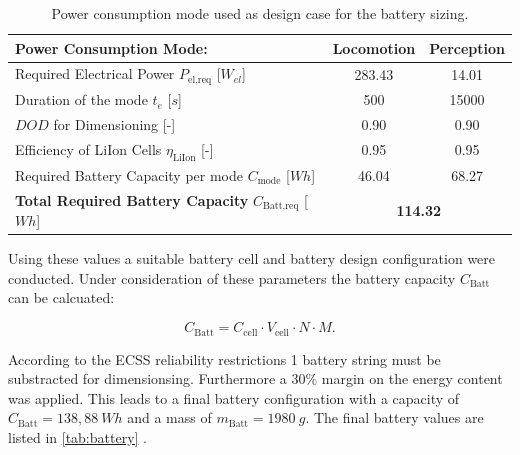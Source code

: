 \begin{table}[htb]
\centering

\begin{tabular}{|l|c|c|}
\hline
\textbf{Power Consumption Mode:}                        & \textbf{Locomotion} & \textbf{Perception} \\ \hline
Required Electrical Power $P_\text{el,req}$ [$W_{el}$]         & 283.43              & 14.01               \\ \hline
Duration of the mode $t_e$ [$s$]                          & 500              & 15000            \\ \hline
$DOD$ for Dimensioning [-]                              & 0.90                & 0.90                \\ \hline
Efficiency of LiIon Cells $\eta_\text{LiIon}$ [-]       & 0.95                & 0.95                \\ \hline
Required Battery Capacity per mode $C_\text{mode}$ [$Wh$] & 46.04               & 68.27               \\ \hline
\textbf{Total Required Battery Capacity} $C_\text{Batt,req}$ [$Wh$]    & \multicolumn{2}{c|}{\textbf{114.32}}               \\ \hline
\end{tabular}

\caption{Power consumption mode used as design case for the battery sizing.}
\label{tab:batsize}
\end{table}

Using these values a suitable battery cell and battery design configuration were conducted. Under consideration of these parameters the battery capacity $C_\text{Batt}$ can be calcuated:

\begin{equation}
C_\text{Batt} = C_\text{cell} \cdot V_\text{cell} \cdot N \cdot M .
\label{eq:batuse}
\end{equation}

According to the ECSS reliability restrictions 1 battery string must be substracted for dimensionsing. Furthermore a $30 \%$ margin on the energy content was applied. This leads to a final battery configuration with a capacity of $C_\text{Batt}=138,88 \ Wh$ and a mass of $m_\text{Batt} = 1980 \ g$. The final battery values are listed in \autoref{tab:battery} \cite{SAFTBatteries.2018}.


